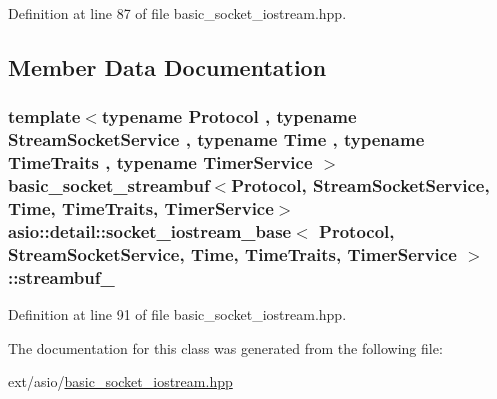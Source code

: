 Definition at line 87 of file basic\+\_\+socket\+\_\+iostream.\+hpp.



\subsection{Member Data Documentation}
\hypertarget{classasio_1_1detail_1_1socket__iostream__base_ac5d4983a9fb3035497092a1de10616d6}{}
\subsubsection[{streambuf\+\_\+}]{\setlength{\rightskip}{0pt plus 5cm}template$<$typename Protocol , typename Stream\+Socket\+Service , typename Time , typename Time\+Traits , typename Timer\+Service $>$ {\bf basic\+\_\+socket\+\_\+streambuf}$<$Protocol, Stream\+Socket\+Service, Time, Time\+Traits, Timer\+Service$>$ {\bf asio\+::detail\+::socket\+\_\+iostream\+\_\+base}$<$ Protocol, Stream\+Socket\+Service, Time, Time\+Traits, Timer\+Service $>$\+::streambuf\+\_\+\hspace{0.3cm}{\ttfamily [protected]}}\label{classasio_1_1detail_1_1socket__iostream__base_ac5d4983a9fb3035497092a1de10616d6}


Definition at line 91 of file basic\+\_\+socket\+\_\+iostream.\+hpp.



The documentation for this class was generated from the following file\+:\begin{DoxyCompactItemize}
\item 
ext/asio/\hyperlink{basic__socket__iostream_8hpp}{basic\+\_\+socket\+\_\+iostream.\+hpp}\end{DoxyCompactItemize}
